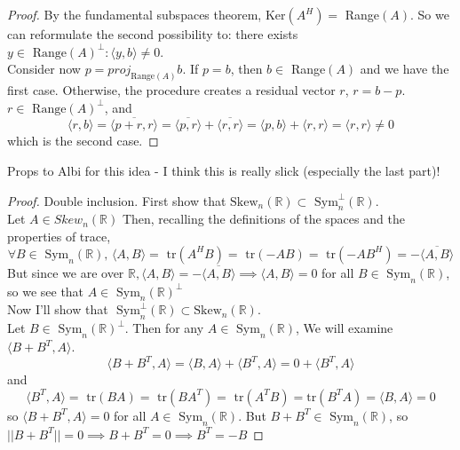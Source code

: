 \documentclass[12pt]{article}
\newenvironment{problem}[2][Problem]{\begin{trivlist}
\item[\hskip \labelsep {\bfseries #1}\hskip \labelsep {\bfseries #2.}]}{\end{trivlist}}
\theoremstyle{definition}
\theoremstyle{definition}
\theoremstyle{definition}
\theoremstyle{definition}
\begin{document}
\begin{problem}{3.44}
\begin{proof}
 By the fundamental subspaces theorem, Ker$(A^H) =$ Range$(A)$. So we can reformulate the second possibility to: there exists $y \in \text{ Range}(A)^\perp : \langle y, b \rangle \neq 0 $. \\
 Consider now $p = proj_{\text{Range}(A)}b$. If $p = b$, then $b \in$ Range$(A)$ and we have the first case. Otherwise, the procedure creates a residual vector $r$, $r = b - p$. $r \in \text{ Range}(A)^\perp$, and 
$$\langle r, b \rangle = \overline{\langle p + r, r \rangle} = \overline{\langle p, r \rangle} + \overline{\langle r, r \rangle} = \langle p, b \rangle + \langle r, r \rangle = \langle r, r \rangle \neq 0$$
which is the second case. 
\end{proof}
\end{problem}

\begin{problem}{3.45}
Props to Albi for this idea - I think this is really slick (especially the last part)!
\begin{proof}
Double inclusion. First show that $\text{Skew}_n(\mathbb{R}) \subset \text{ Sym}_n^\perp(\mathbb{R})$. \\
Let $A \in {Skew}_n(\mathbb{R})$ Then, recalling the definitions of the spaces and the properties of trace,
$$\forall B \in \text{ Sym}_n(\mathbb{R})\text{, } \langle A, B \rangle = \text{ tr}(A^HB) = \text{ tr}(-AB) = \text{ tr}(-AB^H) = -\overline{\langle A, B \rangle}
$$ 
But since we are over $\mathbb{R}, \langle A, B \rangle = -\overline{\langle A, B \rangle} \implies \langle A,B \rangle = 0$ for all $B \in \text{ Sym}_n(\mathbb{R})$, so we see that $A \in \text{ Sym}_n(\mathbb{R})^{\perp}$ \\
Now I'll show that $\text{ Sym}_n^\perp(\mathbb{R}) \subset \text{Skew}_n(\mathbb{R})$. \\
Let $B \in \text{ Sym}_n(\mathbb{R})^\perp$. Then for any $A \in \text{ Sym}_n(\mathbb{R})$, We will examine $\langle B+B^T, A \rangle$.
$$
\langle B+B^T,A \rangle = \langle B, A\rangle + \langle B^T, A\rangle = 0 + \langle B^T, A\rangle 
$$
and $$
\langle B^T, A \rangle = \text{ tr}(BA) = \text{ tr}(BA^T) = \text{ tr}(A^TB) = \text{tr}(B^TA) = \langle B, A \rangle = 0
$$
so $\langle B+B^T, A \rangle = 0$ for all $A \in \text{ Sym}_n(\mathbb{R})$. But $B+B^T \in \text{ Sym}_n(\mathbb{R})$, so $||B+B^T|| = 0 \implies B+B^T=0 \implies B^T = -B$
\end{proof}
\end{problem}
\end{document}
